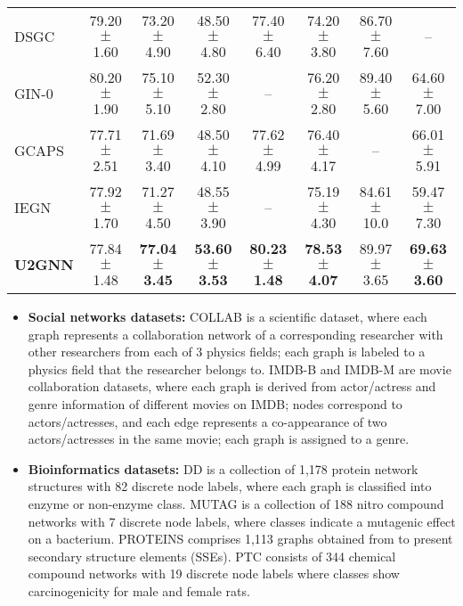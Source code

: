\documentclass[twoside,leqno,twocolumn]{article}
\newcommand{\citep}{\cite}
\newcommand{\citeyearpar}{\cite}
\begin{document}
\begin{table*}[!ht]
{\begin{tabular}{l|c|c|c|c|c|c|c}
DSGC \citeyearpar{seo2019discriminative} & 79.20 $\pm$ 1.60 & 73.20 $\pm$ 4.90 & 48.50 $\pm$ 4.80 & 77.40 $\pm$ 6.40 & 74.20 $\pm$ 3.80 & 86.70 $\pm$ 7.60 & --\\
GIN-0 \citeyearpar{xu2019powerful} & 80.20 $\pm$ 1.90  & 75.10 $\pm$ 5.10 & 52.30 $\pm$ 2.80 & -- & 76.20 $\pm$ 2.80 & {89.40 $\pm$ 5.60} & 64.60 $\pm$ 7.00\\
GCAPS \citeyearpar{verma2018graph} & 77.71 $\pm$ 2.51 & 71.69 $\pm$ 3.40 & 48.50 $\pm$ 4.10 & 77.62 $\pm$ 4.99 & 76.40 $\pm$ 4.17 & -- & 66.01 $\pm$ 5.91\\
IEGN \citeyearpar{maron2019invariant} & 77.92 $\pm$ 1.70 & 71.27 $\pm$ 4.50 & 48.55 $\pm$ 3.90 & -- & 75.19 $\pm$ 4.30 & 84.61 $\pm$ 10.0 & 59.47 $\pm$ 7.30 \\
\hline
\textbf{U2GNN} & 77.84 $\pm$ 1.48 & \textbf{77.04 $\pm$ 3.45} & \textbf{53.60 $\pm$ 3.53} & \textbf{80.23 $\pm$ 1.48} & \textbf{78.53 $\pm$ 4.07} & 89.97 $\pm$ 3.65 & \textbf{69.63 $\pm$ 3.60}\\
\hline
\end{tabular}
}
\label{tab:expresult_sup}
\end{table*}

\begin{itemize}

\item \textbf{Social networks datasets:} COLLAB is a scientific dataset, where each graph represents a collaboration network of a corresponding researcher with other researchers from each of 3 physics fields; each graph is labeled to a physics field that the researcher belongs to.
IMDB-B and IMDB-M are movie collaboration datasets, where each graph is derived from actor/actress and genre information of different movies on IMDB; nodes correspond to actors/actresses, and each edge represents a co-appearance of two actors/actresses in the same movie; each graph is assigned to a genre.


\item \textbf{Bioinformatics datasets:} DD \citep{dobson2003distinguishingDD} is a collection of 1,178 protein network structures with 82 discrete node labels, where each graph is classified into enzyme or non-enzyme class.
MUTAG \citep{debnath1991structureMUTAG} is a collection of 188 nitro compound networks with 7 discrete node labels, where classes indicate a mutagenic effect on a bacterium.
PROTEINS comprises 1,113 graphs obtained from \citep{borgwardt2005PROTEINENZYMES} to present secondary structure elements (SSEs). 
PTC \citep{toivonen2003statisticalPTC} consists of 344 chemical compound networks with 19 discrete node labels where classes show carcinogenicity for male and female rats.

\end{itemize}
\end{document}
